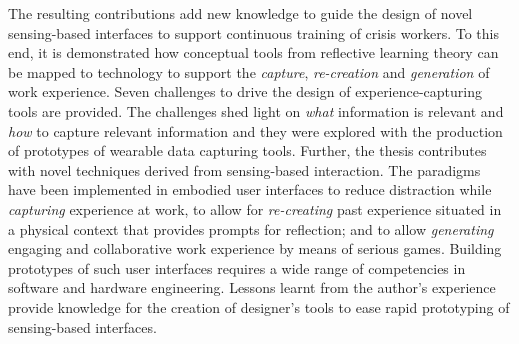 The resulting contributions add new knowledge to guide the design of novel sensing-based interfaces to support continuous training of crisis workers. To this end, it is demonstrated how conceptual tools from reflective learning theory can be mapped to technology to support the \emph{capture}, \emph{re-creation} and \emph{generation} of work experience. Seven challenges to drive the design of experience-capturing tools are provided. The challenges shed light on \emph{what} information is relevant and \emph{how} to capture relevant information and they were explored with the production of prototypes of wearable data capturing tools. Further, the thesis contributes with novel techniques derived from sensing-based interaction. The paradigms have been implemented in embodied user interfaces to reduce distraction while \emph{capturing} experience at work, to allow for \emph{re-creating} past experience situated in a physical context that provides prompts for reflection; and to allow \emph{generating} engaging and collaborative work experience by means of serious games. Building prototypes of such user interfaces requires a wide range of competencies in software and hardware engineering. Lessons learnt from the author's experience provide knowledge for the creation of designer's tools to ease rapid prototyping of sensing-based interfaces.
